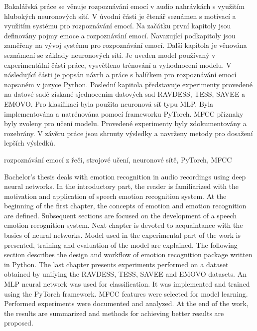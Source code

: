 \documentclass[FM,BP]{tulthesis}
\begin{document}

\begin{abstractCZ}  %
Bakalářská práce se věnuje rozpoznávání emocí v audio nahrávkách s využitím hlubokých neuronových sítí. V úvodní části je čtenář seznámen s motivací a využitím systému pro rozpoznávání emocí. Na začátku první kapitoly jsou definovány pojmy emoce a rozpoznávání emocí. Navazující podkapitoly jsou zaměřeny na vývoj systému pro rozpoznávání emocí. Další kapitola je věnována seznámení se základy neuronových sítí. Je uveden model používaný v experimentální části práce, vysvětleno trénování a vyhodnocení modelu. V následující části je popsán návrh a práce s balíčkem pro rozpoznávání emocí napsaném v jazyce Python. Poslední kapitola představuje experimenty provedené na datové sadě získané sjednocením datových sad RAVDESS, TESS, SAVEE a EMOVO. Pro klasifikaci byla použita neuronová síť typu MLP. Byla implementována a natrénována pomocí frameworku PyTorch. MFCC příznaky byly zvoleny pro učení modelu. Provedené experimenty byly zdokumentovány a rozebrány. V závěru práce jsou shrnuty výsledky a navrženy metody pro dosažení lepších výsledků.
\end{abstractCZ}

\begin{keywordsCZ}
rozpoznávání emocí z řeči, strojové učení, neuronové sítě, PyTorch, MFCC
\end{keywordsCZ}


\vspace{2cm}

\begin{abstractEN}
Bachelor's thesis deals with emotion recognition in audio recordings using deep neural networks. In the introductory part, the reader is familiarized with the motivation and application of speech emotion recognition system. At the beginning of the first chapter, the concepts of emotion and emotion recognition are defined. Subsequent sections are focused on the development of a speech emotion recognition system. Next chapter is devoted to acquaintance with the basics of neural networks. Model used in the experimental part of the work is presented, training and evaluation of the model are explained. The following section describes the design and workflow of emotion recognition package written in Python. The last chapter presents experiments performed on a dataset obtained by unifying the RAVDESS, TESS, SAVEE and EMOVO datasets. An MLP neural network was used for classification. It was implemented and trained using the PyTorch framework. MFCC features were selected for model learning. Performed experiments were documented and analyzed. At the end of the work, the results are summarized and methods for achieving better results are proposed.
\end{abstractEN}
\end{document}
